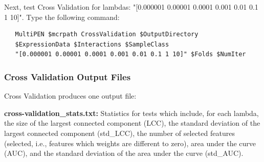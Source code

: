 \documentclass[11pt, oneside]{article}   	%
\begin{document}
Next, test Cross Validation for lambdas: "[0.000001 0.00001 0.0001 0.001 0.01 0.1 1 10]". Type the following command:


\begin{framed}
\begin{verbatim}
   MultiPEN $mcrpath CrossValidation $OutputDirectory 
   $ExpressionData $Interactions $SampleClass 
   "[0.000001 0.00001 0.0001 0.001 0.01 0.1 1 10]" $Folds $NumIter
\end{verbatim}
\end{framed}




\subsubsection{Cross Validation Output Files}


Cross Validation produces one output file:

{\bf cross-validation\_stats.txt:} Statistics for tests which include, for each lambda, the size of the largest connected component (LCC), the standard deviation of the largest connected component (std\_LCC), the number of selected features (selected, i.e., features which weights are different to zero), area under the curve (AUC), and the standard deviation of the area under the curve (std\_AUC).






\end{document}
